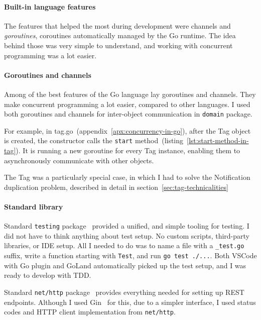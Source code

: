\paragraph*{Built-in language features}\label{par:built-in-language-features}

The features that helped the most during development
were channels and \emph{goroutines},
coroutines automatically managed by the Go runtime.
The idea behind those was very simple to understand,
and working with concurrent programming was a lot easier.

\paragraph*{Goroutines and channels}\label{par:goroutines-and-channels}

Among of the best features of the Go language lay goroutines and channels.
They make concurrent programming a lot easier, compared to other languages.
I used both goroutines and channels
for inter-object communication in \texttt{domain} package.

For example, in {tag.go}~(appendix~\ref{apx:concurrency-in-go}),
after the Tag object is created,
the constructor calls
the \texttt{start} method~(listing~\ref{lst:start-method-in-tag}).
It is running a new goroutine for every Tag instance,
enabling them to asynchronously communicate with other objects.

The Tag was a particularly special case,
in which I had to solve
the Notification duplication problem,
described in detail in section~\ref{sec:tag-technicalities}

\paragraph*{Standard library}\label{par:standard-library}

Standard \texttt{testing} package~\cite{cox_testing_2022} provided
a unified, and simple tooling for testing.
I did not have to think anything about test setup.
No custom scripts, third-party libraries, or IDE setup.
All I needed to do was to name a file with a \texttt{\_test.go} suffix,
write a function starting with \texttt{Test},
and run \texttt{go\ test\ ./...}.
Both VSCode with Go plugin and GoLand
automatically picked up the test setup,
and I was ready to develop with TDD.

Standard \texttt{net/http} package~\cite{cox_http_2022} provides everything
needed for setting up REST endpoints.
Although I used Gin~\cite{martinez-almeida_gin_2022} for this,
due to a simpler interface,
I used status codes and HTTP client implementation from \texttt{net/http}.

